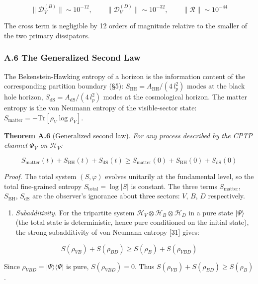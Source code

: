 \documentclass[
]{article}
\providecommand{\tightlist}{%
  \setlength{\itemsep}{0pt}\setlength{\parskip}{0pt}}
\begin{document}
\[\|\mathcal{D}_V^{(B)}\| \sim 10^{-12}, \qquad \|\mathcal{D}_V^{(D)}\| \sim 10^{-32}, \qquad \|\mathcal{R}\| \sim 10^{-44}\]

The cross term is negligible by 12 orders of magnitude relative to the
smaller of the two primary dissipators.

\hypertarget{a.6-the-generalized-second-law}{%
\subsubsection{A.6 The Generalized Second
Law}\label{a.6-the-generalized-second-law}}

The Bekenstein-Hawking entropy of a horizon is the information content
of the corresponding partition boundary (§5):
\(S_{\text{BH}} = A_{\text{BH}} / (4\,l_p^2)\) modes at the black hole
horizon, \(S_{\text{dS}} = A_{\text{dS}} / (4\,l_p^2)\) modes at the
cosmological horizon. The matter entropy is the von Neumann entropy of
the visible-sector state:
\(S_{\text{matter}} = -\text{Tr}[\rho_V \log \rho_V]\).

\textbf{Theorem A.6} (Generalized second law). \emph{For any process
described by the CPTP channel \(\Phi_V\) on \(\mathcal{H}_V\):}

\[S_{\text{matter}}(t) + S_{\text{BH}}(t) + S_{\text{dS}}(t) \geq S_{\text{matter}}(0) + S_{\text{BH}}(0) + S_{\text{dS}}(0)\]

\emph{Proof.} The total system \((S, \varphi)\) evolves unitarily at the
fundamental level, so the total fine-grained entropy
\(S_{\text{total}} = \log|S|\) is constant. The three terms
\(S_{\text{matter}}\), \(S_{\text{BH}}\), \(S_{\text{dS}}\) are the
observer's ignorance about three sectors: \(V\), \(B\), \(D\)
respectively.

\begin{enumerate}
\def\labelenumi{(\roman{enumi})}
\tightlist
\item
  \emph{Subadditivity.} For the tripartite system
  \(\mathcal{H}_V \otimes \mathcal{H}_B \otimes \mathcal{H}_D\) in a
  pure state \(|\Psi\rangle\) (the total state is deterministic, hence
  pure conditioned on the initial state), the strong subadditivity of
  von Neumann entropy {[}31{]} gives:
\end{enumerate}

\[S(\rho_{VB}) + S(\rho_{BD}) \geq S(\rho_B) + S(\rho_{VBD})\]

Since \(\rho_{VBD} = |\Psi\rangle\langle\Psi|\) is pure,
\(S(\rho_{VBD}) = 0\). Thus
\(S(\rho_{VB}) + S(\rho_{BD}) \geq S(\rho_B)\).
\end{document}
